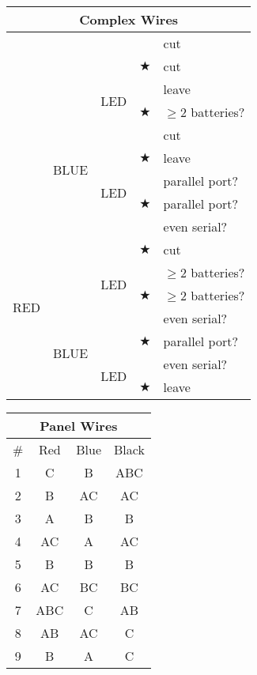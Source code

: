 \documentclass[11pt]{amsart}
\begin{document}
\begin{tabular}{|c|c|c|c|l|}
\hline
\multicolumn{5}{|c|}{Complex Wires} \\
\hline
\multirow{8}{*}{} & \multirow{4}{*}{} & \multirow{2}{*}{} & & cut \\
\cline{4-5}
 & & & $\bigstar$ & cut \\
\cline{3-5}
 & & \multirow{2}{*}{LED} & & leave \\
\cline{4-5}
 & & & $\bigstar$ & $\ge 2$ batteries? \\
\cline{2-5}
 & \multirow{4}{*}{BLUE} & & & cut \\
\cline{4-5}
 & & & $\bigstar$ & leave \\
\cline{3-5}
 & & \multirow{2}{*}{LED} & & parallel port? \\
\cline{4-5}
 & & & $\bigstar$ & parallel port? \\
\hline
\multirow{8}{*}{RED} & \multirow{4}{*}{} & \multirow{2}{*}{} & & even serial?\\
\cline{4-5}
 & & & $\bigstar$ & cut \\
\cline{3-5}
 & & \multirow{2}{*}{LED} & & $\ge 2$ batteries? \\
\cline{4-5}
 & & & $\bigstar$ & $\ge 2$ batteries? \\
\cline{2-5}
 & \multirow{4}{*}{BLUE} & & & even serial? \\
\cline{4-5}
 & & & $\bigstar$ & parallel port? \\
\cline{3-5}
 & & \multirow{2}{*}{LED} & & even serial? \\
\cline{4-5}
 & & & $\bigstar$ & leave \\
\hline
\end{tabular}

\begin{tabular}{|c|c|c|c|}
\hline
\multicolumn{4}{|c|}{Panel Wires} \\
\hline
\# & Red & Blue & Black \\
\hline
1  & C   & B   & ABC \\
2  & B   & AC  & AC  \\
3  & A   & B   & B   \\
4  & AC  & A   & AC  \\
5  & B   & B   & B   \\
6  & AC  & BC  & BC  \\
7  & ABC & C   & AB  \\
8  & AB  & AC  & C   \\
9  & B   & A   & C   \\
\hline
\end{tabular}
\end{document}
